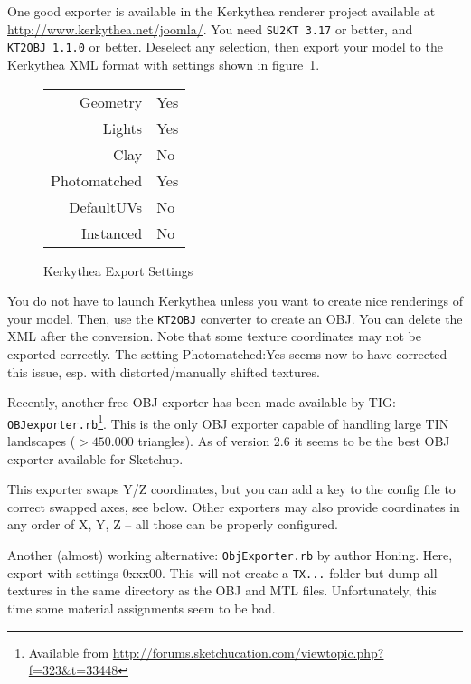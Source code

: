 \documentclass[a4paper]{article}
\newcommand{\filename}[1]{\texttt{#1}}
\begin{document}
One good exporter is available in the Kerkythea renderer project
available at \url{http://www.kerkythea.net/joomla/}.  You need \filename{SU2KT~3.17}
or better, and \filename{KT2OBJ~1.1.0} or better.  Deselect any selection, then
export your model to the Kerkythea XML format with settings shown in figure~\ref{fig:KerkytheaExportSettings}.
\begin{figure}[hb]
  \centering
\begin{tabular}{rl}
Geometry&Yes\\Lights&Yes\\Clay&No\\Photomatched&Yes\\DefaultUVs&No\\Instanced&No
\end{tabular}
\caption{Kerkythea Export Settings}
  \label{fig:KerkytheaExportSettings}
\end{figure}


You do not have to launch Kerkythea unless you want to create nice renderings of your model. 
Then, use the \filename{KT2OBJ} converter to create an OBJ.  You can delete the XML
after the conversion.  Note that some texture coordinates may not be
exported correctly. The setting Photomatched:Yes seems now to have
corrected this issue, esp. with distorted/manu\-ally shifted textures.

Recently, another free OBJ exporter has been made available by 
TIG: \filename{OBJexporter.rb}\footnote{Available from \url{http://forums.sketchucation.com/viewtopic.php?f=323&t=33448}}. 
This is the only OBJ exporter capable of handling large TIN landscapes ($>450.000$ triangles). 
As of version 2.6 it seems to be the best OBJ exporter available for Sketchup. 


This exporter swaps Y/Z coordinates, but you can add a key to the config
file to correct swapped axes, see below. Other exporters may also
provide coordinates in any order of X, Y, Z -- all those can be
properly configured.

Another (almost) working alternative: \filename{ObjExporter.rb} by author Honing.  Here,
export with settings 0xxx00. This will not create a \filename{TX...} folder but
dump all textures in the same directory as the OBJ and MTL
files. Unfortunately, this time some material assignments seem to be
bad. 
\end{document}

